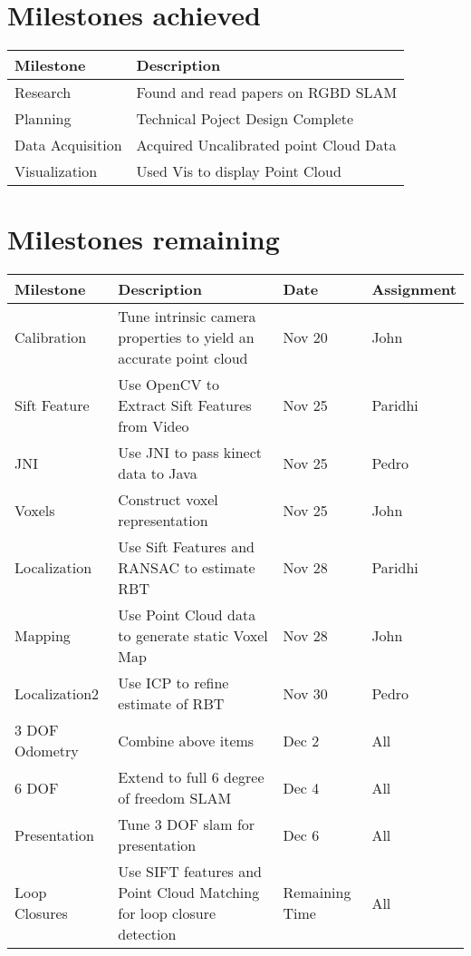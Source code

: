\documentclass[12pt]{article}
\begin{document}
\section{Milestones achieved}
\begin{tabular}{| l | p{9cm} | }
\hline
Milestone & Description \\ \hline
Research & Found and read papers on RGBD SLAM \\ \hline
Planning & Technical Poject Design Complete \\ \hline
Data Acquisition & Acquired Uncalibrated point Cloud Data \\ \hline
Visualization & Used Vis to display Point Cloud \\ \hline

\end{tabular}


\section{Milestones remaining}
\begin{tabular}{|l |p{7cm}| |l| l|}
\hline
Milestone & Description & Date & Assignment \\ \hline
Calibration & Tune intrinsic camera properties to yield an accurate point cloud & Nov 20 & John \\ \hline
Sift Feature & Use OpenCV to Extract Sift  Features from Video & Nov 25 & Paridhi \\ \hline
JNI & Use JNI to pass kinect data to Java & Nov 25 & Pedro \\ \hline
Voxels & Construct voxel representation & Nov 25 & John \\ \hline
Localization & Use Sift Features and RANSAC to  estimate RBT & Nov 28 & Paridhi \\ \hline
Mapping & Use Point Cloud data to generate  static Voxel Map & Nov 28 & John \\ \hline
Localization2 & Use ICP to refine estimate of RBT & Nov 30 & Pedro \\ \hline
3 DOF Odometry & Combine above items & Dec 2 & All \\ \hline
6 DOF & Extend to full 6 degree of freedom SLAM & Dec 4 & All \\ \hline
Presentation & Tune 3 DOF slam for presentation & Dec 6 & All \\ \hline
Loop Closures & Use SIFT features and Point Cloud  Matching for loop closure detection & Remaining Time & All \\ \hline

\end{tabular}
\end{document}
